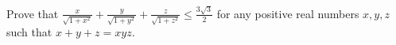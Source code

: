 Prove that $\displaystyle \frac{x}{\sqrt{1+x^2}} + \frac{y}{\sqrt{1+y^2}} +
\frac{z}{\sqrt{1+z^2}} \le \frac{3\sqrt3}{2}$ for any positive real numbers $x,
y, z$ such that $x + y + z = xyz$.
